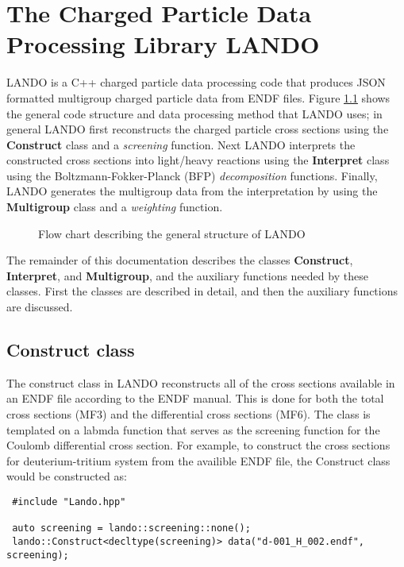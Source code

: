 \documentclass[../main.tex]{subfiles}
\begin{document}
\chapter{The Charged Particle Data Processing Library LANDO}
LANDO is a C++ charged particle data processing code that produces JSON formatted multigroup charged particle data from ENDF files. Figure \ref{fig:LANDO_code_structure} shows the general code structure and data processing method that LANDO uses; in general LANDO first reconstructs the charged particle cross sections using the \textbf{Construct} class and a \textit{screening} function. Next LANDO interprets the constructed cross sections into light/heavy reactions using the \textbf{Interpret} class using the Boltzmann-Fokker-Planck (BFP) \textit{decomposition} functions. Finally, LANDO generates the multigroup data from the interpretation by using the \textbf{Multigroup} class and a \textit{weighting} function.

\begin{figure}[!htb]
\centering
{}
\caption{Flow chart describing the general structure of LANDO}
\label{fig:LANDO_code_structure}
\end{figure}

The remainder of this documentation describes the classes \textbf{Construct}, \textbf{Interpret}, and \textbf{Multigroup}, and the auxiliary functions needed by these classes. First the classes are described in detail, and then the auxiliary functions are discussed.

\section{Construct class}
The construct class in LANDO reconstructs all of the cross sections available in an ENDF file according to the ENDF manual. This is done for both the total cross sections (MF3) and the differential cross sections (MF6). The class is templated on a labmda function that serves as the screening function for the Coulomb differential cross section. For example, to construct the cross sections for deuterium-tritium system from the availible ENDF file, the Construct class would be constructed as:

\begin{verbatim}
 #include "Lando.hpp"

 auto screening = lando::screening::none();
 lando::Construct<decltype(screening)> data("d-001_H_002.endf", screening);
\end{verbatim}
\end{document}
